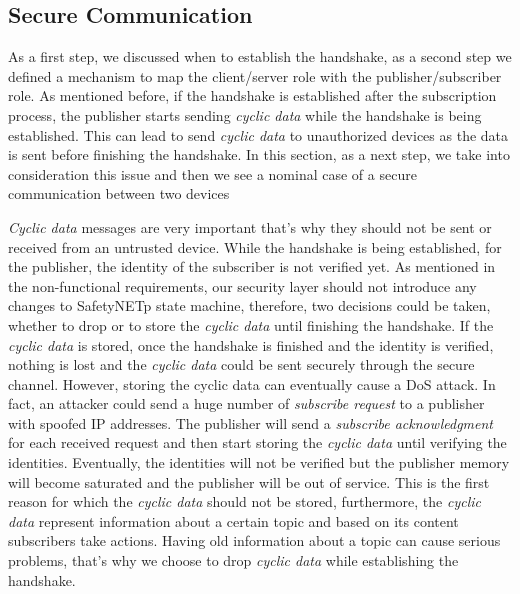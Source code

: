 \subsection{Secure Communication}

As a first step, we discussed when to establish the handshake, as a second step
we defined a mechanism to map the client/server role with the publisher/subscriber role.
As mentioned before, if the handshake is established after the subscription process,
the publisher starts sending \textit{cyclic data} while the handshake is being established.
This can lead to send \textit{cyclic data} to unauthorized devices as the data is sent before finishing the handshake.
In this section, as a next step, we take into consideration this issue and then we see a nominal case of a secure communication between two devices

\textit{Cyclic data} messages are very important that's why they should not be sent or received from
an untrusted device. While the handshake is being established, for the publisher,
the identity of the subscriber is not verified yet. As mentioned in the non-functional
requirements, our security layer should not introduce any changes to SafetyNETp state machine, therefore, two decisions could be taken,
whether to drop or to store the \textit{cyclic data} until finishing the handshake. If the \textit{cyclic data}
is stored, once the handshake is finished and the identity is verified, nothing is lost and
the \textit{cyclic data} could be sent securely through the secure channel. However, storing the cyclic
data can eventually cause a DoS attack. In fact, an attacker could send a huge number
of \textit{subscribe request} to a publisher with spoofed IP addresses. The publisher will send
a \textit{subscribe acknowledgment} for each received request and then start storing the \textit{cyclic data}
until verifying the identities. Eventually, the identities will not be verified but the publisher
memory will become saturated and the publisher will be out of service. This is the first
reason for which the \textit{cyclic data} should not be stored, furthermore, the \textit{cyclic data} represent
information about a certain topic and based on its content subscribers take actions.
Having old information about a topic can cause serious problems, that's why we choose to drop
\textit{cyclic data} while establishing the handshake.

